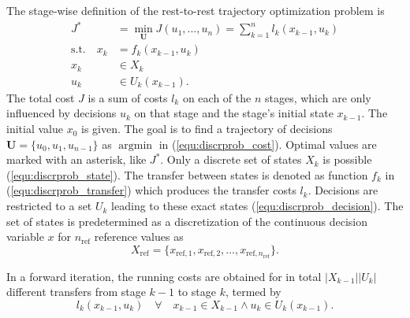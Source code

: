 \documentclass[runningheads]{llncs}
\newcommand{\bm}[1]{\boldsymbol{#1}}
\DeclareMathOperator*{\argmin}{argmin}
\begin{document}
The stage-wise definition of the rest-to-rest trajectory optimization problem is 
\begin{align}
J^* & = \min_{\bm{U}}{J(u_1,...,u_n)} 
= 
\sum_{k=1}^{n} l_k(x_{k-1},u_k)  \label{equ:discrprob_cost} \\
\mathrm{s.t.} \quad x_k & = f_k(x_{k-1},u_k) \label{equ:discrprob_transfer} \\
x_k & \in X_k \label{equ:discrprob_state}\\
u_k & \in U_k (x_{k-1}) \label{equ:discrprob_decision}.
\end{align}
The total cost $J$ is a sum of costs $l_k$ on each of the $n$ stages, which are only influenced by decisions $u_k$ on that stage and the stage's initial state $x_{k-1}$.
The initial value $x_0$ is given.
The goal is to find a trajectory of decisions $\bm{U}=\{u_0,u_1,u_{n-1}\}$ as $\argmin$ in (\ref{equ:discrprob_cost}).
Optimal values are marked with an asterisk, like $J^*$.
Only a discrete set of states $X_k$ is possible (\ref{equ:discrprob_state}).
The transfer between states is denoted as function $f_k$ in (\ref{equ:discrprob_transfer}) which produces the transfer costs $l_k$.
Decisions are restricted to a set $U_k$ leading to these exact states (\ref{equ:discrprob_decision}).
The set of states is predetermined as a discretization of the continuous decision variable $x$ for $n_{\mathrm{ref}}$ reference values as
\begin{equation} X_\mathrm{ref}=
\{
x_{\mathrm{ref},1},x_{\mathrm{ref},2},...,x_{\mathrm{ref},n_{\mathrm{ref}}}
\}.
\label{equ:dp_refstate}
\end{equation}

In a forward iteration, the running costs are obtained for in total $|X_{k-1}||U_k|$ different transfers from stage $k-1$ to stage $k$, termed by
%
\begin{equation}
l_k(x_{k-1},u_k) \quad \forall \quad x_{k-1} \in X_{k-1} \land u_k \in U_k(x_{k-1}).
\label{equ:dp_forward}
\end{equation}
\end{document}
